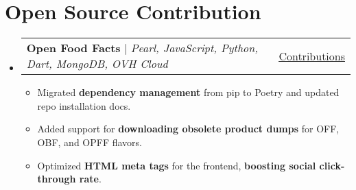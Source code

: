 \documentclass[a4paper,11pt]{article}
\makeatletter
\newcommand{\resumeItem}[1]{\item\small{#1 \vspace{-2pt}}}
\newcommand{\resumeProject}[3]{
    \item
    \begin{tabular*}{0.97\textwidth}{l@{\extracolsep{\fill}}r}
        \small#2 & \small\href{#1}{\underline{#3}} \\
    \end{tabular*}\vspace{-7pt}
}
\newcommand{\resumeSubHeadingListStart}{\begin{itemize}[leftmargin=0.15in, label={}]}
\newcommand{\resumeSubHeadingListEnd}{\end{itemize}}
\newcommand{\resumeItemListStart}{\begin{itemize}}
\newcommand{\resumeItemListEnd}{\end{itemize}\vspace{-5pt}}
\makeatother
\begin{document}
\section{Open Source Contribution}
\resumeSubHeadingListStart
    \resumeProject
        {https://github.com/openfoodfacts/folksonomy_api/commits?author=areebahmeddd}{\textbf{Open Food Facts} $|$ \emph{Pearl, JavaScript, Python, Dart, MongoDB, OVH Cloud}}{Contributions}
        \resumeItemListStart
            \resumeItem{Migrated \textbf{dependency management} from pip to Poetry and updated repo installation docs.}
            \resumeItem{Added support for \textbf{downloading obsolete product dumps} for OFF, OBF, and OPFF flavors.}
            \resumeItem{Optimized \textbf{HTML meta tags} for the frontend, \textbf{boosting social click-through rate}.}
        \resumeItemListEnd
\resumeSubHeadingListEnd

\end{document}
